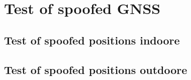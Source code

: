 \section{Test of spoofed GNSS}


\subsection{Test of spoofed positions indoore}
\label{sec:test_of_spoofed_positions_indoore}



\subsection{Test of spoofed positions outdoore}
\label{sec:test_of_spoofed_positions_outdoore}

